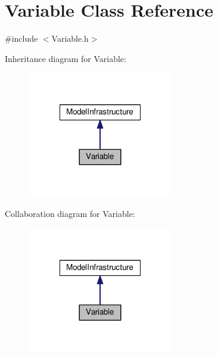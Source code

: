 \hypertarget{class_variable}{\section{Variable Class Reference}
\label{class_variable}
}


{\ttfamily \#include $<$Variable.\-h$>$}



Inheritance diagram for Variable\-:\nopagebreak
\begin{figure}[H]
\begin{center}
\leavevmode
\includegraphics[width=180pt]{class_variable__inherit__graph}
\end{center}
\end{figure}


Collaboration diagram for Variable\-:\nopagebreak
\begin{figure}[H]
\begin{center}
\leavevmode
\includegraphics[width=180pt]{class_variable__coll__graph}
\end{center}
\end{figure}
